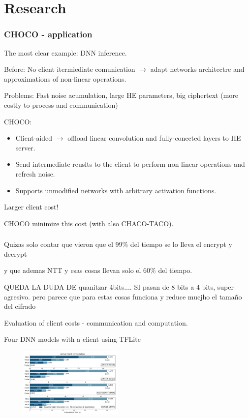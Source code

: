 \documentclass[10pt,handout]{beamer}
\begin{document}

\section{Research}

\begin{frame}
\frametitle{CHOCO - application}

The most clear example: DNN inference.

Before: No client itermiediate comunication $\rightarrow$ adapt networks architectre and approximations of non-linear operations.

    Problems: Fast noise acumulation, large HE parameters, big ciphertext (more costly to process and communication)

CHOCO:
\begin{itemize}
    \item Client-aided $\rightarrow$ offload linear convolution and fully-conected layers to HE server.
    \item Send intermediate reuslts to the client to perform non-linear operations and refresh noise.
    \item Supports unmodified networks with arbitrary activation functions.
\end{itemize}

Larger client cost!

    CHOCO minimize this cost (with also CHACO-TACO).

\end{frame}




\begin{frame}
\frametitle{}

Quizas solo contar que vieron que el 99\% del tiempo se lo lleva el encrypt y decrypt

y que ademas NTT y esas cosas llevan solo el 60\% del tiempo.

QUEDA LA DUDA DE quanitzar 4bits.... SI pasan de 8 bits a 4 bits, super agresivo.
pero parece que para estas cosas funciona y reduce mucjho el tamaño del cifrado

Evaluation of client costs - communication and computation.

Four DNN models with a client using TFLite
\begin{figure}
    \includegraphics[width=0.45\textwidth]{motivation.png}
\end{figure}

\end{frame}
\end{document}
